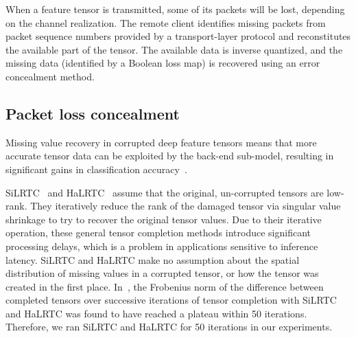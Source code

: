 \documentclass[conference,letterpaper]{IEEEtran}
\begin{document}
When a feature tensor is transmitted, some of its packets will be lost, depending on the channel realization. The remote client identifies missing packets from packet sequence numbers provided by a transport-layer protocol and reconstitutes the available part of the tensor. The available data is inverse quantized, and the missing data (identified by a Boolean loss map) is recovered using an error concealment method. 

\subsection{Packet loss concealment} \label{subsec:description:concealment}
Missing value recovery in corrupted deep feature tensors means that more accurate tensor data can be exploited by the back-end sub-model, resulting in significant gains in classification accuracy~\cite{CALTeC_ICIP_2021}. 

SiLRTC~\cite{liu2012tensor} and HaLRTC~\cite{liu2012tensor} assume that the original, un-corrupted tensors are low-rank. They iteratively reduce the rank of the damaged tensor via singular value shrinkage to try to recover the original tensor values. Due to their iterative operation, these general tensor completion methods introduce significant processing delays, which is a problem in applications sensitive to inference latency. SiLRTC and HaLRTC make no assumption about the spatial distribution of missing values in a corrupted tensor, or how the tensor was created in the first place. %
In~\cite{Bragile2020}, the Frobenius norm of the difference between completed tensors over successive iterations of tensor completion with SiLRTC and HaLRTC was found to have reached a plateau within 50 iterations. Therefore, we ran SiLRTC and HaLRTC for 50 iterations in our experiments.
\end{document}
